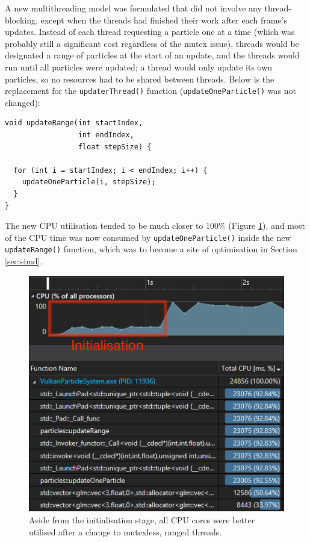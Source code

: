 \documentclass[11pt, a4paper, twocolumn]{article}
\begin{document}
A new multithreading model was formulated that did not involve any thread-blocking, except when the threads had finished their work after each frame's updates. Instead of each thread requesting a particle one at a time (which was probably still a significant cost regardless of the mutex issue), threads would be designated a range of particles at the start of an update, and the threads would run until all particles were updated; a thread would only update its own particles, so no resources had to be shared between threads. Below is the replacement for the \verb|updaterThread()| function (\verb|updateOneParticle()| was not changed):

\begin{verbatim}
void updateRange(int startIndex,
                 int endIndex,
                 float stepSize) {
  
  for (int i = startIndex; i < endIndex; i++) {
    updateOneParticle(i, stepSize);
  }
}
\end{verbatim}

The new CPU utilisation tended to be much closer to 100\% (Figure \ref{fig:mutexless-diag}), and most of the CPU time was now consumed by \verb|updateOneParticle()| inside the new \verb|updateRange()| function, which was to become a site of optimisation in Section \ref{sec:simd}.

\begin{figure}[h]
\includegraphics[width=\linewidth]{mutexless-diag}
\caption{Aside from the initialisation stage, all CPU cores were better utilised after a change to mutexless, ranged threads.}
\label{fig:mutexless-diag}
\end{figure}
\end{document}
